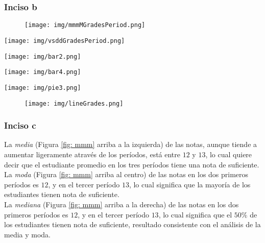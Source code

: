 \documentclass[a4paper,10pt,twocolumn]{article}
\begin{document}
\vspace{-0.5cm}	\subsubsection{Inciso b}
			\begin{figure}[h]
				\vspace{1cm}\texttt{[image: img/mmmMGradesPeriod.png]}
			\end{figure}
			
			\hspace{-1.2cm}\texttt{[image: img/vsddGradesPeriod.png]}
			\vspace{-0.8cm}	\label{fig: mmm}
	
			\hspace{-1.3cm}	\texttt{[image: img/bar2.png]}	

			\hspace{-1.3cm}	\texttt{[image: img/bar4.png]}
			\label{fig: gradesInterval}

			\hspace{-1.3cm}	\texttt{[image: img/pie3.png]}
			\label{fig: pie}

			\begin{figure}[h]
			\texttt{[image: img/lineGrades.png]}
			\label{fig: line}
			\end{figure}
	
	\subsubsection{Inciso c}
	La \emph{media} (Figura \ref{fig: mmm} arriba a la izquierda) de las notas, aunque tiende a aumentar ligeramente através de los períodos, está entre $12$ y $13$, lo cual quiere decir que el estudiante promedio en los tres períodos tiene una nota de suficiente.\\
	
	La \emph{moda} (Figura \ref{fig: mmm} arriba al centro) de las notas en los dos primeros períodos es $12$, y en el tercer período $13$, lo cual significa que la mayoría de los estudiantes tienen nota de suficiente.\\
	
	La \emph{mediana} (Figura \ref{fig: mmm} arriba a la derecha) de las notas en los dos primeros períodos es $12$, y en el tercer período $13$, lo cual significa que el $50\%$ de los estudiantes tienen nota de suficiente, resultado consistente con el análisis de la media y moda.\\
	
\end{document}
